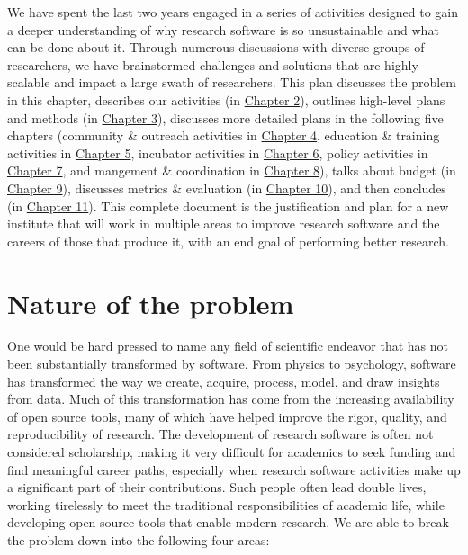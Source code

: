 \documentclass[
]{book}
\begin{document}
We have spent the last two years engaged in a series of activities designed to gain a
deeper understanding of why research software is so unsustainable and what can be done
about it. Through numerous discussions with diverse groups of researchers, we have
brainstormed challenges and solutions that are highly scalable and impact a large swath
of researchers. This plan discusses the problem in this chapter, describes our activities
(in \protect\hyperlink{chapter2}{Chapter 2}),
outlines high-level plans and methods (in \protect\hyperlink{chapter3}{Chapter 3}),
discusses more detailed plans in the following five chapters
(community \& outreach activities in \protect\hyperlink{Ch-Comm}{Chapter 4},
education \& training activities in \protect\hyperlink{Ch-Edu}{Chapter 5},
incubator activities in \protect\hyperlink{Ch-Incubator}{Chapter 6},
policy activities in \protect\hyperlink{Ch-Policy}{Chapter 7},
and
mangement \& coordination in \protect\hyperlink{Ch-Org}{Chapter 8}),
talks about budget (in \protect\hyperlink{Ch-Budget}{Chapter 9}),
discusses metrics \& evaluation (in \protect\hyperlink{Ch-Metrics}{Chapter 10}),
and then concludes (in \protect\hyperlink{Ch-Summary}{Chapter 11}).
This complete document is the justification and plan for a new institute that will work
in multiple areas to improve research software and the careers of those that produce it,
with an end goal of performing better research.

\hypertarget{nature-of-the-problem}{%
\section{Nature of the problem}\label{nature-of-the-problem}}

One would be hard pressed to name any field of scientific endeavor that has not been substantially transformed by software. From physics to psychology, software has transformed the way we create, acquire, process, model, and draw insights from data. Much of this transformation has come from the increasing availability of open source tools, many of which have helped improve the rigor, quality, and reproducibility of research. The development of research software is often not considered scholarship, making it very difficult for academics to seek funding and find meaningful career paths, especially when research software activities make up a significant part of their contributions. Such people often lead double lives, working tirelessly to meet the traditional responsibilities of academic life, while developing open source tools that enable modern research. We are able to break the problem down into the following four areas:
\end{document}
